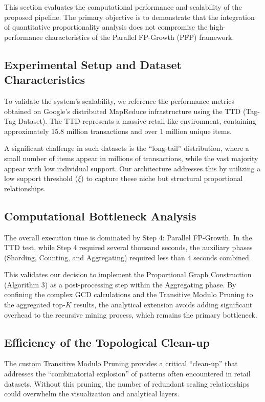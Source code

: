 \documentclass[10pt, twocolumn]{article}
\begin{document}
This section evaluates the computational performance and scalability of the
proposed pipeline. The primary objective is to demonstrate that the integration
of quantitative proportionality analysis does not compromise the
high-performance characteristics of the Parallel FP-Growth (PFP) framework.

\subsection{Experimental Setup and Dataset Characteristics}

To validate the system's scalability, we reference the performance metrics
obtained on Google’s distributed MapReduce infrastructure using the TTD
(Tag-Tag Dataset). The TTD represents a massive retail-like environment,
containing approximately $15.8$ million transactions and over $1$ million
unique items.

A significant challenge in such datasets is the ``long-tail'' distribution,
where a small number of items appear in millions of transactions, while the
vast majority appear with low individual support. Our architecture addresses
this by utilizing a low support threshold ($\xi$) to capture these niche but
structural proportional relationships.

\subsection{Computational Bottleneck Analysis}

The overall execution time is dominated by Step 4: Parallel FP-Growth. In the
TTD test, while Step 4 required several thousand seconds, the auxiliary phases
(Sharding, Counting, and Aggregating) required less than $4$ seconds combined.

This validates our decision to implement the Proportional Graph Construction
(Algorithm 3) as a post-processing step within the Aggregating phase. By
confining the complex GCD calculations and the Transitive Modulo Pruning to the
aggregated top-$K$ results, the analytical extension avoids adding significant
overhead to the recursive mining process, which remains the primary bottleneck.

\subsection{Efficiency of the Topological Clean-up}

The custom Transitive Modulo Pruning provides a critical ``clean-up'' that
addresses the ``combinatorial explosion'' of patterns often encountered in
retail datasets. Without this pruning, the number of redundant scaling
relationships could overwhelm the visualization and analytical layers.
\end{document}
